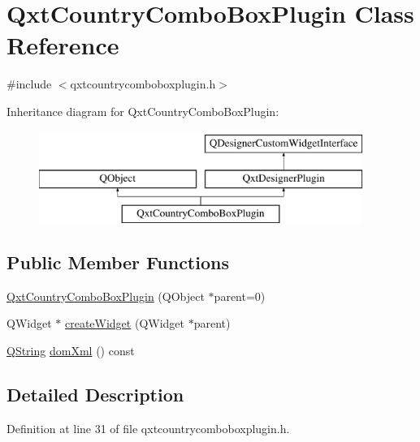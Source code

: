 \hypertarget{class_qxt_country_combo_box_plugin}{\section{Qxt\-Country\-Combo\-Box\-Plugin Class Reference}
\label{class_qxt_country_combo_box_plugin}
}


{\ttfamily \#include $<$qxtcountrycomboboxplugin.\-h$>$}

Inheritance diagram for Qxt\-Country\-Combo\-Box\-Plugin\-:\begin{figure}[H]
\begin{center}
\leavevmode
\includegraphics[height=3.000000cm]{class_qxt_country_combo_box_plugin}
\end{center}
\end{figure}
\subsection*{Public Member Functions}
\begin{DoxyCompactItemize}
\item 
\hyperlink{class_qxt_country_combo_box_plugin_a0a74c3dab292a447ed3c56ec5f4252e5}{Qxt\-Country\-Combo\-Box\-Plugin} (Q\-Object $\ast$parent=0)
\item 
Q\-Widget $\ast$ \hyperlink{class_qxt_country_combo_box_plugin_aa5b112381659208612285007c624545c}{create\-Widget} (Q\-Widget $\ast$parent)
\item 
\hyperlink{group___u_a_v_objects_plugin_gab9d252f49c333c94a72f97ce3105a32d}{Q\-String} \hyperlink{class_qxt_country_combo_box_plugin_af72424d447c6752c19ddc53272748963}{dom\-Xml} () const 
\end{DoxyCompactItemize}


\subsection{Detailed Description}


Definition at line 31 of file qxtcountrycomboboxplugin.\-h.



